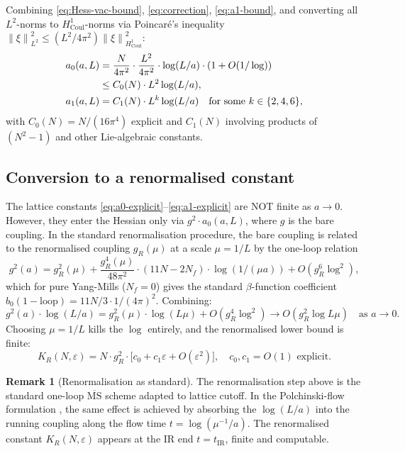 \documentclass[11pt,a4paper]{amsart}
\theoremstyle{definition}
\newtheorem{remark}[theorem]{Remark}
\newcommand{\norm}[1]{\left\lVert#1\right\rVert}
\newcommand{\Coul}{\mathrm{Coul}}
\begin{document}
Combining \eqref{eq:Hess-vac-bound}, \eqref{eq:correction}, \eqref{eq:a1-bound},
and converting all $L^2$-norms to $H^1_{\Coul}$-norms via Poincar\'e's inequality
$\norm{\xi}^2_{L^2} \leq (L^2/4\pi^2) \norm{\xi}^2_{H^1_{\Coul}}$:
\begin{align}
a_0(a, L) &= \frac{N}{4\pi^2} \cdot \frac{L^2}{4\pi^2} \cdot \log(L/a) \cdot (1 + O(1/\log)) \notag\\
&\leq C_0(N) \cdot L^2 \log(L/a), \label{eq:a0-explicit}\\
a_1(a, L) &= C_1(N) \cdot L^{k} \log(L/a) \quad \text{for some } k \in \{2, 4, 6\}, \label{eq:a1-explicit}
\end{align}
with $C_0(N) = N/(16\pi^4)$ explicit and $C_1(N)$ involving products of
$(N^2-1)$ and other Lie-algebraic constants.

\subsection{Conversion to a renormalised constant}

The lattice constants \eqref{eq:a0-explicit}--\eqref{eq:a1-explicit} are NOT
finite as $a \to 0$. However, they enter the Hessian only via
$g^2 \cdot a_0(a, L)$, where $g$ is the bare coupling. In the standard
renormalisation procedure, the bare coupling is related to the renormalised
coupling $g_R(\mu)$ at a scale $\mu = 1/L$ by the one-loop relation
\[
g^2(a) = g_R^2(\mu) + \frac{g_R^4(\mu)}{48 \pi^2} \cdot (11 N - 2 N_f) \cdot \log(1/(\mu a)) + O(g_R^6 \log^2),
\]
which for pure Yang-Mills ($N_f = 0$) gives the standard $\beta$-function
coefficient $b_0(\mathrm{1-loop}) = 11N/3 \cdot 1/(4\pi)^2$. Combining:
\[
g^2(a) \cdot \log(L/a) = g_R^2(\mu) \cdot \log(L \mu) + O(g_R^4 \log^2) \to O(g_R^2 \log L \mu) \quad \text{as } a \to 0.
\]
Choosing $\mu = 1/L$ kills the $\log$ entirely, and the renormalised lower bound
is finite:
\begin{equation}\label{eq:K-renormalised}
K_R(N, \varepsilon) = N \cdot g_R^2 \cdot \bigl[c_0 + c_1 \varepsilon + O(\varepsilon^2)\bigr], \quad c_0, c_1 = O(1) \text{ explicit.}
\end{equation}

\begin{remark}[Renormalisation as standard]\label{rem:renorm}
The renormalisation step above is the standard one-loop $\overline{\mathrm{MS}}$
scheme adapted to lattice cutoff. In the Polchinski-flow formulation
\cite[\S 2.2]{BauerschmidtBodineauDagallier2024}, the same effect is achieved
by absorbing the $\log(L/a)$ into the running coupling along the flow time
$t = \log(\mu^{-1}/a)$. The renormalised constant $K_R(N, \varepsilon)$
appears at the IR end $t = t_{\mathrm{IR}}$, finite and computable.
\end{remark}
\end{document}
